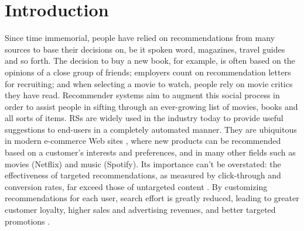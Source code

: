 \documentclass[cic,tc,english]{iiufrgs}
\begin{document}








\chapter{Introduction}
Since time immemorial, people have relied on recommendations from many sources to base their decisions on, be it spoken word, magazines, travel guides and so forth. The decision to buy a new book, for example, is often based on the opinions of a close group of friends; employers count on recommendation letters for recruiting; and when selecting a movie to watch, people rely on movie critics they have read. Recommender systems aim to augment this social process in order to assist people in sifting through an ever-growing list of movies, books and all sorts of items. RSs are widely used in the industry today to provide useful suggestions to end-users in a completely automated manner. They are ubiquitous in modern e-commerce Web sites \cite{Schafer2001}, where new products can be recommended based on a customer's interests and preferences, and in many other fields such as movies (Netflix) and music (Spotify). Its importance can't be overstated: the effectiveness of targeted recommendations, as measured by click-through and conversion rates, far exceed those of untargeted content \cite{Linden2003}. By customizing recommendations for each user, search effort is greatly reduced, leading to greater customer loyalty, higher sales and advertising revenues, and better targeted promotions \cite{Ansari2000}.
\end{document}
